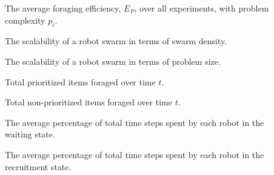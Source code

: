\begin{description}
	\item[\parbox{\namewidth}{$E_{p_i}$}] The average foraging efficiency, $E_P$, over all experiments, with problem complexity $p_i$.

	\item[\parbox{\namewidth}{$S_c$}] The scalability of a robot swarm in terms of swarm density.	
	
	\item[\parbox{\namewidth}{$S_p$}] The scalability of a robot swarm in terms of problem size.	
	
	\item[\parbox{\namewidth}{$E^t_P$}] Total prioritized items foraged over time $t$.	

	\item[\parbox{\namewidth}{$E^t_{NP}$}] Total non-prioritized items foraged over time $t$.	
	
	\item[\parbox{\namewidth}{$t_{wait}$}] The average percentage of total time steps spent by each robot in the waiting state.

	\item[\parbox{\namewidth}{$t_{recruitment}$}] The average percentage of total time steps spent by each robot in the recruitment state. 
	
	

\end{description}
